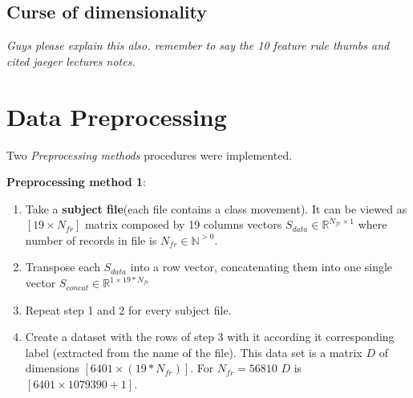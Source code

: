 \subsection{Curse of dimensionality}

\textit{Guys please explain this also. remember to say the 10 feature rule thumbs and cited jaeger lectures notes.}


\section{Data Preprocessing}

Two \textit{Preprocessing methods} procedures were implemented.

\textbf{Preprocessing method 1}:
\begin{enumerate}
	\item Take a \textbf{subject file}(each file contains a class movement). It can be viewed as $[19 \times N_{fr}]$ matrix composed by 19 columns vectors $S_{data} \in \mathbb{R}^{N_{fr} \times 1}$  where number of records in file is $N_{fr} \in \mathbb{N}^{>0}$.
	\item Transpose each $S_{data}$ into a row vector, concatenating them into one single vector $S_{concat} \in  \mathbb{R}^{1 \times 19*N_{fr} }$ 
	\item Repeat step 1 and 2 for every subject file.
	\item Create a dataset with the rows of step 3 with it according it corresponding label (extracted from the name of the file). This data set is a matrix $D$ of dimensions $[6401 \times (19*N_{fr})]$. For $N_{fr}=56810$ $D$ is $[6401 \times 1079390+1]$.
\end{enumerate}

